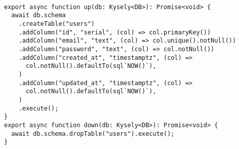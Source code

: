 \begin{verbatim}

export async function up(db: Kysely<DB>): Promise<void> {
  await db.schema
    .createTable("users")
    .addColumn("id", "serial", (col) => col.primaryKey())
    .addColumn("email", "text", (col) => col.unique().notNull())
    .addColumn("password", "text", (col) => col.notNull())
    .addColumn("created_at", "timestamptz", (col) =>
      col.notNull().defaultTo(sql`NOW()`),
    )
    .addColumn("updated_at", "timestamptz", (col) =>
      col.notNull().defaultTo(sql`NOW()`),
    )
    .execute();
}
export async function down(db: Kysely<DB>): Promise<void> {
  await db.schema.dropTable("users").execute();
}
\end{verbatim}